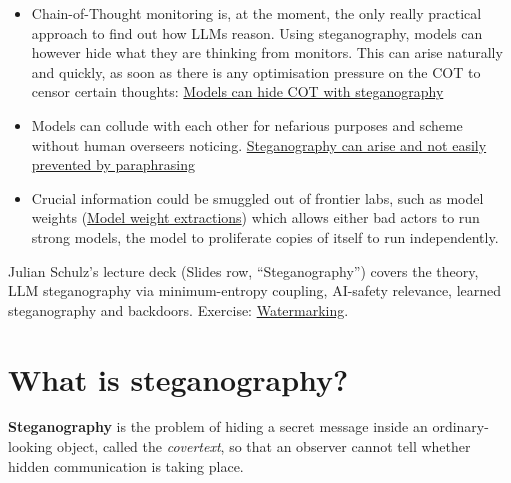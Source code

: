 \documentclass[11pt]{article}
\begin{document}
\begin{itemize}
  \item Chain-of-Thought monitoring is, at the moment, the only really
        practical approach to find out how LLMs reason. Using steganography,
        models can however hide what they are thinking from monitors. This can
        arise naturally and quickly, as soon as there is any optimisation
        pressure on the COT to censor certain thoughts:
        \href{https://arxiv.org/html/2506.01926v2}{Models can hide COT with
        steganography}
  \item Models can collude with each other for nefarious purposes and scheme
        without human overseers noticing.
        \href{https://arxiv.org/pdf/2410.03768}{Steganography can arise and not
        easily prevented by paraphrasing}
  \item Crucial information could be smuggled out of frontier labs, such as
        model weights (\href{https://arxiv.org/pdf/2511.02620}{Model weight
        extractions}) which allows either bad actors to run strong models, the
        model to proliferate copies of itself to run independently.
\end{itemize}

Julian Schulz's lecture deck (Slides row, ``Steganography'') covers the
theory, LLM steganography via minimum-entropy coupling, AI-safety relevance,
learned steganography and backdoors. Exercise:
\href{https://colab.research.google.com/github/wusche1/Iliad_steganography_and_backdoors/blob/main/exercises/watermarking/notebook.ipynb}{Watermarking}.


\section{What is steganography?}

\begin{definition}
\label{def:steganography}
\textbf{Steganography} is the problem of hiding a secret message inside an ordinary-looking object, called the \emph{covertext}, so that an observer cannot tell whether hidden communication is taking place.
\end{definition}
\end{document}
